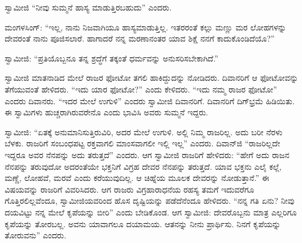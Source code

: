  ಸ್ವಾಮೀಜಿ “ನೀವು ಸುಮ್ಮನೆ ಹಾಸ್ಯ ಮಾಡುತ್ತಿರಬಹುದು” ಎಂದರು. 

 ಮಂಗಳಸಿಂಗ್: “ಇಲ್ಲ, ನಾನು ನಿಜವಾಗಿಯೂ ಹಾಸ್ಯಮಾಡುತ್ತಿಲ್ಲ. ಇತರರಂತೆ ಕಲ್ಲು ಮಣ್ಣು ಮರ ಲೋಹಗಳನ್ನು ದೇವರಂತೆ ನಾನು ಪೂಜಿಸಲಾರೆ. ಹಾಗಾದರೆ ನನ್ನ ಮರಣಾನಂತರ ಯಾವ ಶಿಕ್ಷೆ ನನಗೆ ಕಾದುಕೊಂಡಿದೆಯೊ?” 

 ಸ್ವಾಮೀಜಿ: “ಪ್ರತಿಯೊಬ್ಬನೂ ತನ್ನ ಶ್ರದ್ಧೆಗೆ ತಕ್ಕಂತೆ ಧರ್ಮವನ್ನು ಅನುಸರಿಸಬೇಕಾಗಿದೆ.” 

 ಸ್ವಾಮೀಜಿ ಮಾತನಾಡಿದ ಮೇಲೆ ರಾಜರ ಫೋಟೋ ತಗಲಿ ಹಾಕಿದ್ದುದನ್ನು ನೋಡಿದರು. ದಿವಾನರಿಗೆ ಆ ಫೋಟೋವನ್ನು ತೆಗೆಯುವಂತೆ ಹೇಳಿದರು. “ಇದು ಯಾರ ಫೋಟೋ?” ಎಂದು ಕೇಳಿದರು. “ಇದು ನಮ್ಮ ರಾಜರ ಫೋಟೋ” ಎಂದರು ದಿವಾನರು. “ಇದರ ಮೇಲೆ ಉಗುಳಿ” ಎಂದರು ಸ್ವಾಮೀಜಿ ದಿವಾನರಿಗೆ. ದಿವಾನರಿಗೆ ದಿಗ್‍ಭ್ರಮೆ ಹಿಡಿಯಿತು. ಈ ಸ್ವಾಮಿಗಳು ಹುಚ್ಚರಾಗಿರುವರೇನೊ ಎಂದು ಭಾವಿಸಿ ಅವರು ಸುಮ್ಮನೆ ಇದ್ದರು. 

 ಸ್ವಾಮೀಜಿ: “ಏತಕ್ಕೆ ಅನುಮಾನಿಸುತ್ತಿರುವಿರಿ, ಅದರ ಮೇಲೆ ಉಗುಳಿ. ಅಲ್ಲಿ ನಿಮ್ಮ ರಾಜರಿಲ್ಲ. ಅದು ಬರೀ ನೆರಳು ಬೆಳಕು. ರಾಜರಿಗೆ ಸಂಬಂಧಪಟ್ಟ ರಕ್ತವಾಗಲಿ ಮಾಂಸವಾಗಲೀ ಇಲ್ಲಿ ಇಲ್ಲ” ಎಂದರು. ದಿವಾನ್‍ಜಿ “ರಾಜರಿಲ್ಲದೇ ಇದ್ದರೂ ಅವರ ನೆನಪನ್ನು ಅದು ತರುತ್ತದೆ” ಎಂದರು. ಆಗ ಸ್ವಾಮೀಜಿ ರಾಜರಿಗೆ ಹೇಳಿದರು: “ಹೇಗೆ ಅದು ರಾಜನ ನೆನಪನ್ನು ತರುವುದೋ ಅದರಂತೆಯೇ ಭಕ್ತನಿಗೆ ವಿಗ್ರಹ ದೇವರ ನೆನಪನ್ನು ತರುತ್ತದೆ. ಯಾವ ಭಕ್ತನು ಎಲೈ ಕಲ್ಲೆ, ಮಣ್ಣೆ, ಲೋಹವೆ, ಮರವೆ ಎಂದು ಕರೆಯುವುದಿಲ್ಲ. ಆ ಚಿಹ್ನೆಯ ಮೂಲಕ ದೇವರನ್ನು ನೋಡುತ್ತಾನೆ.” ಈ ವಿಷಯವನ್ನು ರಾಜರಿಗೆ ವಿವರಿಸಿದರು. ಆಗ ರಾಜರು ವಿಗ್ರಹಾರಾಧನೆಯ ರಹಸ್ಯ ತಮಗೆ ಇದುವರೆಗೂ ಗೊತ್ತಿರಲಿಲ್ಲವೆಂದೂ, ಸ್ವಾಮೀಜಿಯವರಿಂದ ಹೊಸ ದೃಷ್ಟಿಯನ್ನು ಪಡೆದೆನೆಂದೂ ಹೇಳಿದರು. “ನನ್ನ ಗತಿ ಏನು? ನೀವು ದಯವಿಟ್ಟು ನನ್ನ ಮೇಲೆ ಕೃಪೆಯನ್ನು ಬೀರಿ” ಎಂದು ಬೇಡಿಕೊಂಡ. ಆಗ ಸ್ವಾಮೀಜಿ: ದೇವರೊಬ್ಬನು ಮಾತ್ರ ಎಲ್ಲರಿಗೂ ಕೃಪೆಯನ್ನು ತೋರಬಲ್ಲ. ಅವನು ಯಾವಾಗಲೂ ದಯಾಮಯ. ಆತನನ್ನು ನೀನು ಪ್ರಾರ್ಥಿಸು. ನಿನಗೆ ಕೃಪೆಯನ್ನು ತೋರುವನು” ಎಂದರು. 

